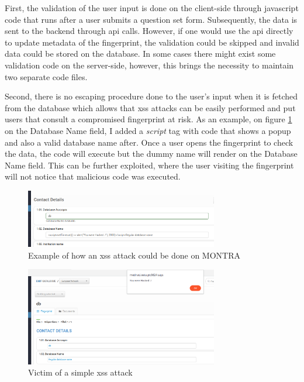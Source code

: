 First, the validation of the user input is done on the client-side through javascript code that runs after a user submits a question set form.
Subsequently, the data is sent to the backend through \gls{api} calls.
However, if one would use the \gls{api} directly to update metadata of the fingerprint, the validation could be skipped and invalid data could be stored on the database.
In some cases there might exist some validation code on the server-side, however, this brings the necessity to maintain two separate code files.

Second, there is no escaping procedure done to the user's input when it is fetched from the database which allows that \gls{xss} attacks can be easily performed and put users that consult a compromised fingerprint at risk.
As an example, on figure \ref{fig:montra-xss-create} on the Database Name field, I added a \textit{script} tag with code that shows a popup and also a valid database name after.
Once a user opens the fingerprint to check the data, the code will execute but the dummy name will render on the Database Name field.
This can be further exploited, where the user visiting the fingerprint will not notice that malicious code was executed.

\begin{figure}[h]
    \center
    \includegraphics[width=0.75\textwidth]{montra-xss-create}
    \caption{Example of how an \gls{xss} attack could be done on MONTRA}
    \label{fig:montra-xss-create}
\end{figure}

\begin{figure}[h]
    \center
    \includegraphics[width=0.75\textwidth]{montra-xss}
    \caption{Victim of a simple \gls{xss} attack}
    \label{fig:montra-xss}
\end{figure}

